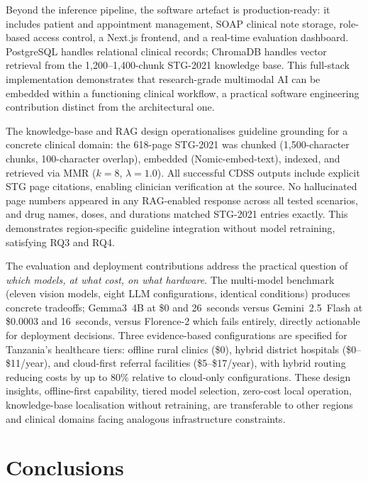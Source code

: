 \documentclass[12pt,a4paper]{report}
\begin{document}
	Beyond the inference pipeline, the software artefact is production-ready: it
	includes patient and appointment management, SOAP clinical note storage,
	role-based access control, a Next.js frontend, and a real-time evaluation
	dashboard. PostgreSQL handles relational clinical records; ChromaDB handles
	vector retrieval from the 1,200--1,400-chunk STG-2021 knowledge base. This
	full-stack implementation demonstrates that research-grade multimodal AI can be
	embedded within a functioning clinical workflow, a practical software engineering
	contribution distinct from the architectural one.
	
	The knowledge-base and RAG design operationalises guideline grounding for a
	concrete clinical domain: the 618-page STG-2021 was chunked (1,500-character
	chunks, 100-character overlap), embedded (Nomic-embed-text), indexed, and
	retrieved via MMR ($k{=}8$, $\lambda{=}1.0$). All successful CDSS outputs
	include explicit STG page citations, enabling clinician verification at the
	source. No hallucinated page numbers appeared in any RAG-enabled response
	across all tested scenarios, and drug names, doses, and durations matched
	STG-2021 entries exactly. This demonstrates region-specific guideline
	integration without model retraining, satisfying RQ3 and RQ4.
	
	The evaluation and deployment contributions address the practical question of
	\emph{which models, at what cost, on what hardware}. The multi-model benchmark
	(eleven vision models, eight LLM configurations, identical conditions)
	produces concrete tradeoffs; Gemma3~4B at \$0 and 26~seconds versus
	Gemini~2.5~Flash at \$0.0003 and 16~seconds, versus Florence-2 which fails
	entirely, directly actionable for deployment decisions. Three evidence-based
	configurations are specified for Tanzania's healthcare tiers: offline rural
	clinics (\$0), hybrid district hospitals (\$0--\$11/year), and cloud-first
	referral facilities (\$5--\$17/year), with hybrid routing reducing costs by
	up to 80\% relative to cloud-only configurations. These design insights, offline-first capability, tiered model selection, zero-cost local operation,
	knowledge-base localisation without retraining, are transferable to other
	regions and clinical domains facing analogous infrastructure constraints.
	
	\section{Conclusions}
	\label{sec:conclusion_conclusions}
	
\end{document}

